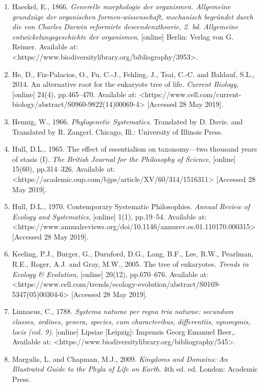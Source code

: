 \documentclass[a4paper]{article}
\begin{document}
\begin{enumerate}
\item Haeckel, E., 1866. \textit{Generelle morphologie der organismen. Allgemeine grundzüge der organischen
formen-wissenschaft, mechanisch begründet durch die von Charles Darwin reformirte descendenztheorie.  2. bd. Allgemeine
entwickelungsgeschichte der organismen}. [online] Berlin: Verlag von G. Reimer. Available at:
{\textless}https://www.biodiversitylibrary.org/bibliography/3953{\textgreater}.
\item He, D., Fiz-Palacios, O., Fu, C.-J., Fehling, J., Tsai, C.-C. and Baldauf, S.L., 2014. An alternative root for the
eukaryote tree of life. \textit{Current Biology}, [online] 24(4), pp.465–470. Available at:
{\textless}https://www.cell.com/current-biology/abstract/S0960-9822(14)00069-4{\textgreater} [Accessed 28 May 2019].
\item Hennig, W., 1966. \textit{Phylogenetic Systematics}. Translated by D. Davis. and Translated by R. Zangerl.
Chicago, Ill.: University of Illinois Press.
\item Hull, D.L., 1965. The effect of essentialism on taxonomy—two thousand years of stasis (I). \textit{The British
Journal for the Philosophy of Science}, [online] 15(60), pp.314–326. Available at:
{\textless}https://academic.oup.com/bjps/article/XV/60/314/1516311{\textgreater} [Accessed 28 May 2019].
\item Hull, D.L., 1970. Contemporary Systematic Philosophies. \textit{Annual Review of Ecology and Systematics},
[online] 1(1), pp.19–54. Available at:
{\textless}https://www.annualreviews.org/doi/10.1146/annurev.es.01.110170.000315{\textgreater} [Accessed 28 May 2019].
\item Keeling, P.J., Burger, G., Durnford, D.G., Lang, B.F., Lee, R.W., Pearlman, R.E., Roger, A.J. and Gray, M.W.,
2005. The tree of eukaryotes. \textit{Trends in Ecology \& Evolution}, [online] 20(12), pp.670–676. Available at:
{\textless}https://www.cell.com/trends/ecology-evolution/abstract/S0169-5347(05)00304-6{\textgreater} [Accessed 28 May
2019].
\item Linnaeus, C., 1788. \textit{Systema naturae per regna tria naturae: secundum classes, ordines, genera, species,
cum characteribus, differentiis, synonymis, locis (vol. 9)}. [online] Lipsiae [Leipzig]: Impensis Georg Emanuel Beer,.
Available at: {\textless}https://www.biodiversitylibrary.org/bibliography/545{\textgreater}.
\item Margulis, L. and Chapman, M.J., 2009. \textit{Kingdoms and Domains: An Illustrated Guide to the Phyla of Life on
Earth}. 4th ed. ed. London: Academic Press.

\end{enumerate}
\end{document}
